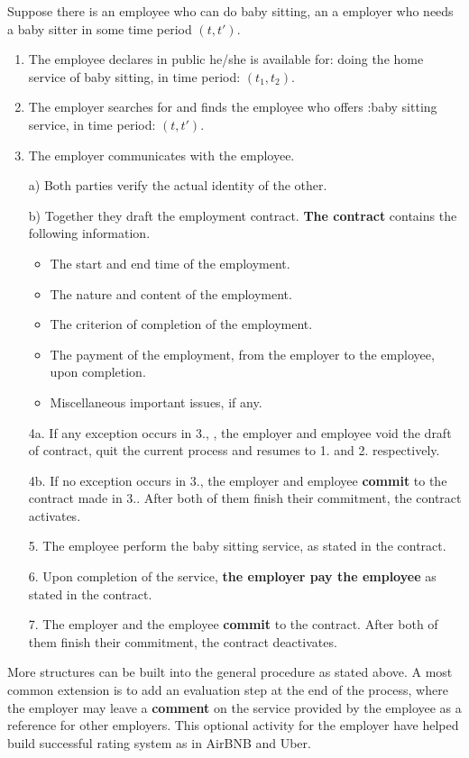 \documentclass[]{scrartcl}
\begin{document}
Suppose there is an employee who can do baby sitting, an a employer who needs a baby sitter in some time period \((t,t')\).
\begin{enumerate}
	\item The employee declares in public he/she is available for: doing the home service of baby sitting, in time period: \((t_1,t_2)\). 
	\item  The employer searches for and finds the employee who offers :baby sitting service, in time period: \((t,t')\).
	\item The employer communicates with the employee. 
	
		a) Both parties verify the actual identity of the other. 
	 	
	 	b) Together they draft the employment contract. \textbf{The contract} contains the following information.
		\begin{itemize}
			\item The start and end time of the employment.
			\item The nature and content of the employment.
			\item The criterion of completion of the employment.
			\item The payment of the employment, from the employer to the employee, upon completion.
			\item Miscellaneous important issues, if any. 	
		\end{itemize}
	\item[4a.] If any exception occurs in 3., , the employer and employee void the draft of contract, quit the current process and resumes to 1. and 2. respectively.
	\item[4b.] If no exception occurs in 3., the employer and employee \textbf{commit} to the contract made in 3.. After both of them finish their commitment, the contract activates.
	\item[5.] The employee perform the baby sitting service, as stated in the contract.
	\item[6.] Upon completion of the service, \textbf{the employer pay the employee} as stated in the contract.
	\item[7.] The employer and the employee \textbf{commit} to the contract. After both of them finish their commitment, the contract deactivates.
\end{enumerate}

More structures can be built into the general procedure as stated above. A most common extension is to add an evaluation step at the end of the process, where the employer may leave a \textbf{comment} on the service provided by the employee as a reference for other employers. This optional activity for the employer have helped build successful rating system as in AirBNB and Uber.
\end{document}

